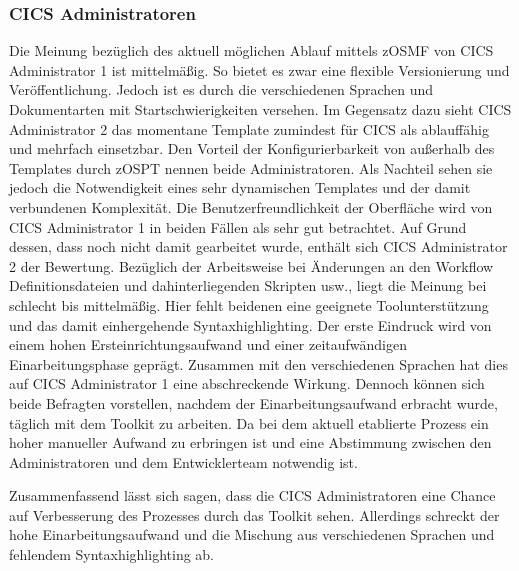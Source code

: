 \subsubsection{CICS Administratoren}
Die Meinung bezüglich des aktuell möglichen Ablauf mittels zOSMF von CICS Administrator 1 ist mittelmäßig.
So bietet es zwar eine flexible Versionierung und Veröffentlichung.
Jedoch ist es durch die verschiedenen Sprachen und Dokumentarten mit Startschwierigkeiten versehen.
Im Gegensatz dazu sieht CICS Administrator 2 das momentane Template zumindest für CICS als ablauffähig und mehrfach einsetzbar.
Den Vorteil der Konfigurierbarkeit von außerhalb des Templates durch zOSPT nennen beide Administratoren.
Als Nachteil sehen sie jedoch die Notwendigkeit eines sehr dynamischen Templates und der damit verbundenen Komplexität.
Die Benutzerfreundlichkeit der Oberfläche wird von CICS Administrator 1 in beiden Fällen als sehr gut betrachtet.
Auf Grund dessen, dass noch nicht damit gearbeitet wurde, enthält sich CICS Administrator 2 der Bewertung.
Bezüglich der Arbeitsweise bei Änderungen an den Workflow Definitionsdateien und dahinterliegenden Skripten usw., liegt die Meinung bei schlecht bis mittelmäßig.
Hier fehlt beidenen eine geeignete Toolunterstützung und das damit einhergehende Syntaxhighlighting.
Der erste Eindruck wird von einem hohen Ersteinrichtungsaufwand und einer zeitaufwändigen Einarbeitungsphase geprägt.
Zusammen mit den verschiedenen Sprachen hat dies auf CICS Administrator 1 eine abschreckende Wirkung.
Dennoch können sich beide Befragten vorstellen, nachdem der Einarbeitungsaufwand erbracht wurde, täglich mit dem Toolkit zu arbeiten.
Da bei dem aktuell etablierte Prozess ein hoher manueller Aufwand zu erbringen ist und eine Abstimmung zwischen den Administratoren und dem Entwicklerteam notwendig ist.

Zusammenfassend lässt sich sagen, dass die CICS Administratoren eine Chance auf Verbesserung des Prozesses durch das Toolkit sehen.
Allerdings schreckt der hohe Einarbeitungsaufwand und die Mischung aus verschiedenen Sprachen und fehlendem Syntaxhighlighting ab.


